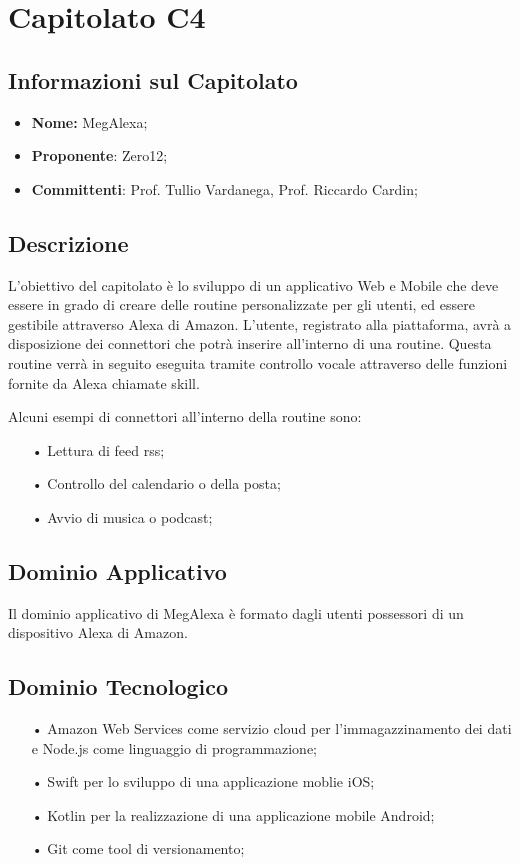 \section{Capitolato C4}
\subsection{Informazioni sul Capitolato}
\begin{itemize}
	\item \textbf{Nome:} MegAlexa;
	\item \textbf{Proponente}: Zero12;
	\item \textbf{Committenti}: Prof. Tullio Vardanega, Prof. Riccardo Cardin;
\end{itemize}

\subsection{Descrizione}
L'obiettivo del capitolato è lo sviluppo di un applicativo Web e Mobile che deve essere in grado di creare delle routine personalizzate per gli utenti, ed essere gestibile attraverso Alexa di Amazon.
L'utente, registrato alla piattaforma, avrà a disposizione dei connettori che potrà inserire all'interno di una routine. Questa routine verrà in seguito eseguita tramite controllo vocale attraverso delle funzioni fornite da Alexa chiamate skill.

Alcuni esempi di connettori all'interno della routine sono:
\begin{itemize}
\item[•] Lettura di feed rss;
\item[•] Controllo del calendario o della posta;
\item[•] Avvio di musica o podcast;
\end{itemize}


\subsection{Dominio Applicativo}
Il dominio applicativo di MegAlexa è formato dagli utenti possessori di un dispositivo Alexa di Amazon.

\subsection{Dominio Tecnologico}
\begin{itemize}
\item[•] Amazon Web Services come servizio cloud per l'immagazzinamento dei dati e Node.js come linguaggio di programmazione;
\item[•] Swift per lo sviluppo di una applicazione moblie iOS;
\item[•] Kotlin per la realizzazione di una applicazione mobile Android;
\item[•] Git come tool di versionamento;
\end{itemize}

